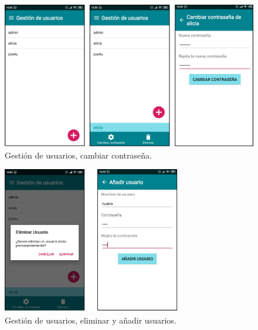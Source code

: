 \begin{figure}[H]
	\centering
	\includegraphics[width=1\textwidth]{../img/gestiondeusuarios.png}
	\caption{Gestión de usuarios, cambiar contraseña.}
	\label{fig:gestiondeusuarios}
\end{figure}

\begin{figure}[H]
	\centering
	\includegraphics[width=0.7\textwidth]{../img/eliminaranadir.png}
	\caption{Gestión de usuarios, eliminar y añadir usuarios.}
	\label{fig:eliminaranadir}
\end{figure}
